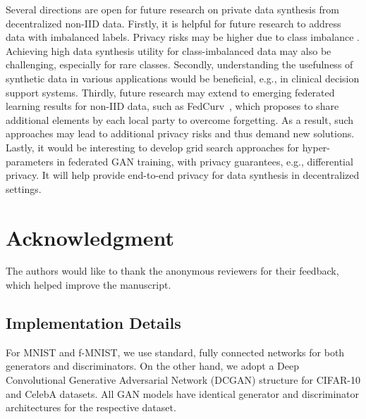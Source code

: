 \documentclass[conference]{IEEEtran}
\begin{document}


Several directions are open for future research on private data synthesis from decentralized non-IID data. Firstly, it is helpful for future research to address data with imbalanced labels. Privacy risks may be higher due to class imbalance \cite{FarrandMST20}. Achieving high data synthesis utility for class-imbalanced data may also be challenging, especially for rare classes.  %
Secondly, understanding the usefulness of synthetic data in various applications would be beneficial, e.g., in clinical decision support systems. Thirdly, future research may extend to emerging federated learning results for non-IID data, such as FedCurv~\cite{shoham2019overcoming}, which proposes to share additional elements by each local party to overcome forgetting. As a result, such approaches may lead to additional privacy risks and thus demand new solutions.  Lastly, it would be interesting to develop grid search approaches for hyper-parameters in federated GAN training, with privacy guarantees, e.g., differential privacy. It will help provide end-to-end privacy for data synthesis in decentralized settings.  %


\section*{Acknowledgment}
The authors would like to thank the anonymous reviewers for their feedback, which helped improve the manuscript. 

 \balance
 
\appendix



\subsection{Implementation Details}


For MNIST and f-MNIST, we use standard, fully connected networks for both generators and discriminators. On the other hand, we adopt a Deep Convolutional Generative Adversarial Network (DCGAN) structure for CIFAR-10 and CelebA datasets. All GAN models have identical generator and discriminator architectures for the respective dataset.
\end{document}
